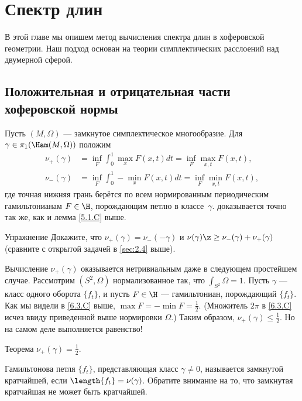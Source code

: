 \chapter{Спектр длин}

В этой главе мы опишем метод вычисления спектра длин в хоферовской геометрии.
Наш подход основан на теории симплектических расслоений над двумерной сферой.

\section{Положительная и отрицательная части хоферовской нормы}

Пусть $(M, \Omega)$ --- замкнутое симплектическое многообразие.
Для $\gamma \in \pi_1 (\Ham(M, \Omega))$ положим 
\begin{align*}
\nu_+ (\gamma) &= \inf_F \int_0^1 \max_x F (x, t)dt = \inf_F \max_{x,t}F (x, t),
\\ 
\nu_- (\gamma) &= \inf_F \int_0^1 -\min_x F (x, t)dt = \inf_F \min_{x,t}F (x, t),
\end{align*}
где точная нижняя грань берётся по всем нормированным периодическим гамильтонианам $F \in \H$, порождающим петлю в классе~$\gamma$.
 доказывается точно так же, как и лемма \ref{5.1.C} выше.

\begin{thm}{Упражнение}
Докажите, что $\nu_+ (\gamma) = \nu_- (-\gamma)$ и $\nu(\gamma) \z\ge \nu_- (\gamma) + \nu_+ (\gamma)$
(сравните с открытой задачей в \ref{sec:2.4} выше).
\end{thm}

Вычисление $\nu_+ (\gamma)$ оказывается нетривиальным даже в следующем простейшем случае.
Рассмотрим $(S^2, \Omega)$ нормализованное так, что $\int_{S^2} \Omega = 1$.
Пусть $\gamma$ --- класс одного оборота $\{f_t\}$, и пусть $F \in \H$ --- гамильтониан, порождающий $\{f_t\}$.
Как мы видели в \ref{6.3.C} выше,  $\max F = - \min F = \frac12$.
(Множитель $2\pi$ в \ref{6.3.C} исчез ввиду приведенной выше нормировки $\Omega$.)
Таким образом, $\nu_+ (\gamma) \le \frac12$.
Но на самом деле выполняется равенство!

\begin{thm}{Теорема}\label{9.1.A}
$\nu_+ (\gamma) = \frac12$.
\end{thm}

Гамильтонова петля $\{f_t \}$, представляющая класс $\gamma \ne 0$, называется замкнутой кратчайшей, если $\length\{f_t \} = \nu(\gamma)$.
Обратите внимание на то, что замкнутая кратчайшая не может быть кратчайшей.

